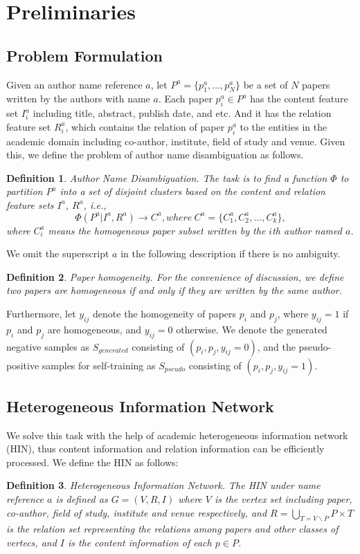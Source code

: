 \documentclass[letterpaper]{article} %
\newtheorem{mydef}{Definition}
\begin{document}
\section{Preliminaries}

\subsection{Problem Formulation}
Given an author name reference $a$, let $P^a =\{p^a_1, \dots, p^a_N\}$ be a set of $N$ papers written by the authors with name $a$. 
Each paper $p_i^a \in P^a$ has the content feature set $I_i^a$ including title, abstract, publish date, and etc. 
And it has the relation feature set $R_i^a$, which contains the relation of paper $p^a_i$ to the entities in the academic domain including co-author, institute, field of study and venue.
Given this, we define the problem of author name disambiguation as follows.  
\begin{mydef}
Author Name Disambiguation. The task is to find a function $\Phi$ to partition $P^a$ into a set of disjoint clusters based on the content and relation feature sets $I^a$, $R^a$, i.e.,
$$\Phi(P^a|I^a, R^a) \to C^a, where \ C^a =\{C^a_1, C^a_2, \dots, C^a_k\},$$
where $C^a_i$ means the homogeneous paper subset written by the $i$th author named $a$.
\vspace*{2pt}
\end{mydef}
We omit the superscript $a$ in the following description if there is no ambiguity.
\begin{mydef}
Paper homogeneity. For the convenience of discussion, we define two papers are homogeneous if and only if they are written by the same author.
\end{mydef}
Furthermore, let $y_{ij}$ denote the homogeneity of papers $p_i$ and $p_j$, where $y_{ij}=1$ if $p_i$ and $p_j$ are homogeneous, and $y_{ij}=0$ otherwise.
We denote the generated negative samples as $S_{generated}$ consisting of $(p_i, p_j, y_{ij}=0)$, and the pseudo-positive samples for self-training as $S_{pseudo}$ consisting of $(p_i, p_j, y_{ij}=1)$.

\subsection{Heterogeneous Information Network}
We solve this task with the help of academic heterogeneous information network (HIN), thus content information and relation information can be efficiently processed.
We define the HIN as follows:
\begin{mydef}
Heterogeneous Information Network. The HIN under name reference $a$ is defined as $G = (V, R, I)$ where $V$ is the vertex set including paper, co-author, field of study, institute and venue respectively, and $R=\bigcup _{T = V \backslash P} P \times T $ is the relation set representing the relations among papers and other classes of vertecs, and $I$ is the content information of each $p\in P$.
\end{mydef}
\end{document}
